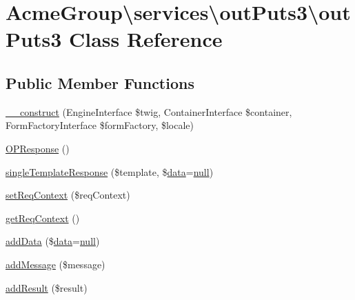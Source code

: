 \hypertarget{class_acme_group_1_1services_1_1out_puts3_1_1out_puts3}{\section{Acme\+Group\textbackslash{}services\textbackslash{}out\+Puts3\textbackslash{}out\+Puts3 Class Reference}
\label{class_acme_group_1_1services_1_1out_puts3_1_1out_puts3}
}
\subsection*{Public Member Functions}
\begin{DoxyCompactItemize}
\item 
\hyperlink{class_acme_group_1_1services_1_1out_puts3_1_1out_puts3_a39fd5ab5e63fcad6bd6c7cf98b2044f0}{\+\_\+\+\_\+construct} (Engine\+Interface \$twig, Container\+Interface \$container, Form\+Factory\+Interface \$form\+Factory, \$locale)
\item 
\hyperlink{class_acme_group_1_1services_1_1out_puts3_1_1out_puts3_a0ee6ed6b4915cd306b7aa9e8bcde8dc7}{O\+P\+Response} ()
\item 
\hyperlink{class_acme_group_1_1services_1_1out_puts3_1_1out_puts3_a9adbc3fa907f4dea7d410d062302d239}{single\+Template\+Response} (\$template, \$\hyperlink{fullpage_2plugin_8js_a718c1bf5a3bf21ebb980203b142e5b75}{data}=\hyperlink{validate_8js_afb8e110345c45e74478894341ab6b28e}{null})
\item 
\hyperlink{class_acme_group_1_1services_1_1out_puts3_1_1out_puts3_a3bafae2391f42fc6008c767f409587d9}{set\+Req\+Context} (\$req\+Context)
\item 
\hyperlink{class_acme_group_1_1services_1_1out_puts3_1_1out_puts3_ab7de93310d9351e6282b61290bf48b08}{get\+Req\+Context} ()
\item 
\hyperlink{class_acme_group_1_1services_1_1out_puts3_1_1out_puts3_a4ffd19bcc74ebb427178ae568a3e1090}{add\+Data} (\$\hyperlink{fullpage_2plugin_8js_a718c1bf5a3bf21ebb980203b142e5b75}{data}=\hyperlink{validate_8js_afb8e110345c45e74478894341ab6b28e}{null})
\item 
\hyperlink{class_acme_group_1_1services_1_1out_puts3_1_1out_puts3_a8fdc9c9a9cfa0f7e8bc4098b69aeaf42}{add\+Message} (\$message)
\item 
\hyperlink{class_acme_group_1_1services_1_1out_puts3_1_1out_puts3_a13f84cadf67369832e84829038e29792}{add\+Result} (\$result)

\end{DoxyCompactItemize}
